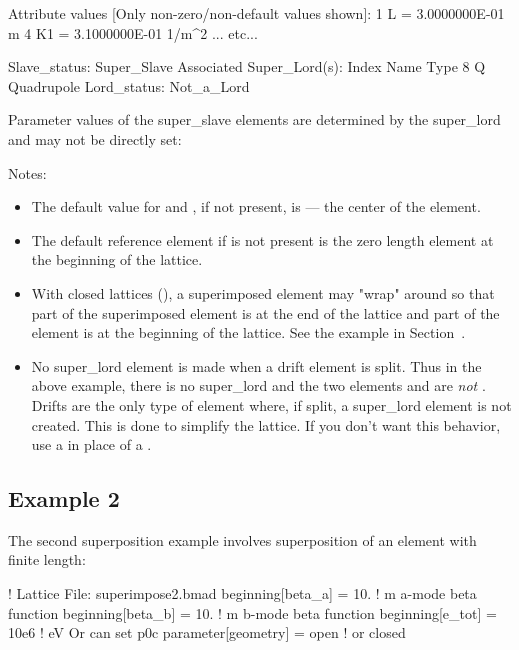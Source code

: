\documentclass{hitec}     %
\begin{document}
{\begin{code}
 Attribute values [Only non-zero/non-default values shown]:
    1   L                            =  3.0000000E-01 m
    4   K1                           =  3.1000000E-01 1/m^2
... etc...

Slave_status: Super_Slave
Associated Super_Lord(s):
   Index   Name                             Type
       8   Q                                Quadrupole
Lord_status:  Not_a_Lord
\end{code}

Parameter values of the super_slave elements are determined by the super_lord and may not be directly set:

Notes:
\vspace{-5 pt}
\begin{itemize}
\item
The default value for  and , if not present, is  --- the center of
the element.
\item
The default reference element if  is not present is the zero length  element
at the beginning of the lattice.
\item
With closed lattices (), a superimposed element may "wrap" around so that part of
the superimposed element is at the end of the lattice and part of the element is at the beginning of
the lattice. See the example in Section~.
\item
No super_lord element is made when a drift element is split. Thus in the above example, there is no
 super_lord and the two elements  and  are {\em not} .
Drifts are the only type of element where, if split, a super_lord element is not created. This is done
to simplify the lattice. If you don't want this behavior, use a  in place of a .
\end{itemize}

\newpage

\subsection{Example 2}

The second superposition example involves superposition of an element with finite length:
\begin{code}
! Lattice File: superimpose2.bmad
beginning[beta_a] = 10.   ! m  a-mode beta function
beginning[beta_b] = 10.   ! m  b-mode beta function
beginning[e_tot] = 10e6   ! eV   Or can set p0c
parameter[geometry] = open      ! or closed


\end{code}}
\end{document}
